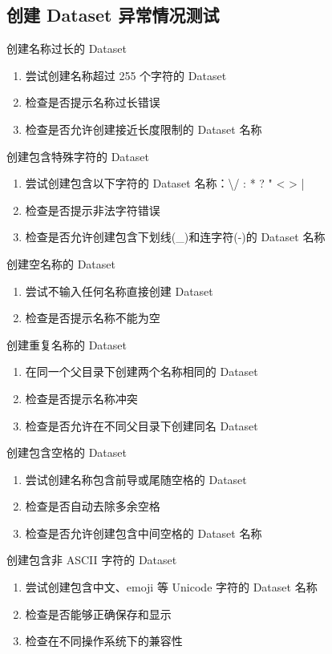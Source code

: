\documentclass[a4paper,12pt]{report}	%
\begin{document}
\subsection{创建 Dataset 异常情况测试}
创建名称过长的 Dataset
\begin{enumerate}
    \item 尝试创建名称超过 255 个字符的 Dataset
    \item 检查是否提示名称过长错误
    \item 检查是否允许创建接近长度限制的 Dataset 名称
\end{enumerate}

创建包含特殊字符的 Dataset
\begin{enumerate}
    \item 尝试创建包含以下字符的 Dataset 名称：\textbackslash / : * ? " < > |
    \item 检查是否提示非法字符错误
    \item 检查是否允许创建包含下划线(\_)和连字符(-)的 Dataset 名称
\end{enumerate}

创建空名称的 Dataset
\begin{enumerate}
    \item 尝试不输入任何名称直接创建 Dataset
    \item 检查是否提示名称不能为空
\end{enumerate}

创建重复名称的 Dataset
\begin{enumerate}
    \item 在同一个父目录下创建两个名称相同的 Dataset
    \item 检查是否提示名称冲突
    \item 检查是否允许在不同父目录下创建同名 Dataset
\end{enumerate}

创建包含空格的 Dataset
\begin{enumerate}
    \item 尝试创建名称包含前导或尾随空格的 Dataset
    \item 检查是否自动去除多余空格
    \item 检查是否允许创建包含中间空格的 Dataset 名称
\end{enumerate}

创建包含非 ASCII 字符的 Dataset
\begin{enumerate}
    \item 尝试创建包含中文、emoji 等 Unicode 字符的 Dataset 名称
    \item 检查是否能够正确保存和显示
    \item 检查在不同操作系统下的兼容性
\end{enumerate}
\end{document}
